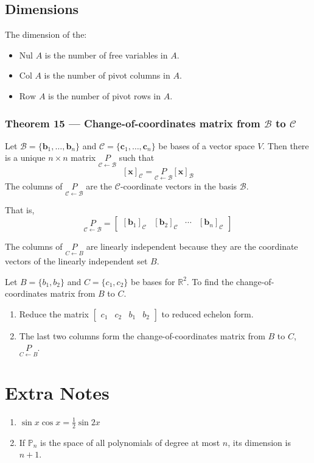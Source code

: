 \documentclass{article}
\begin{document}
\subsection*{Dimensions}
The dimension of the:
\begin{itemize}
    \item $\text{Nul }A$ is the number of free variables in $A$.
    \item $\text{Col }A$ is the number of pivot columns in $A$.
    \item $\text{Row }A$ is the number of pivot rows in $A$.
\end{itemize}

\subsubsection*{Theorem 15 --- Change-of-coordinates matrix from $\mathcal{B}$ to $\mathcal{C}$}
Let $\mathcal{B}=\{\mathbf{b}_1,\ldots, \mathbf{b}_n\}$ and $\mathcal{C}=\{\mathbf{c}_1, \ldots,
\mathbf{c}_n\}$ be bases of a vector space $V$. Then there is a unique $n\times n$ matrix
$\underset{\mathcal{C}\leftarrow\mathcal{B}}{P}$ such that
\[{[\mathbf{x}]}_\mathcal{C}=
\underset{\mathcal{C}\leftarrow\mathcal{B}}{P}{[\mathbf{x}]}_\mathcal{B}\]
The columns of $\underset{\mathcal{C}\leftarrow\mathcal{B}}{P}$ are the $\mathcal{C}$-coordinate
vectors in the basis $\mathcal{B}$.

That is,
\[\underset{\mathcal{C}\leftarrow\mathcal{B}}{P}=\begin{bmatrix}
    {[\mathbf{b}_1]}_\mathcal{C} & {[\mathbf{b}_2]}_\mathcal{C} & \cdots &
    {[\mathbf{b}_n]}_\mathcal{C}
\end{bmatrix}\]

The columns of $\underset{C\leftarrow B}{P}$ are linearly independent because they are the
coordinate vectors of the linearly independent set $B$.

\vspace{1em}

Let $B=\{b_1, b_2\}$ and $C=\{c_1, c_2\}$ be bases for $\mathbb{R}^2$.
To find the change-of-coordinates matrix from $B$ to $C$.
\begin{enumerate}
    \item Reduce the matrix $\begin{bmatrix}c_1 & c_2 & b_1 & b_2\end{bmatrix}$ to reduced echelon
    form.
    \item The last two columns form the change-of-coordinates matrix from $B$ to $C$,
    $\underset{C\leftarrow B}{P}$.
\end{enumerate}

\section*{Extra Notes}
\begin{enumerate}
    \item $\sin x \cos x = \frac{1}{2} \sin 2x$
    \item If $\mathbb{P}_n$ is the space of all polynomials of degree at most $n$, its dimension is
    $n+1$.
\end{enumerate}
\end{document}
